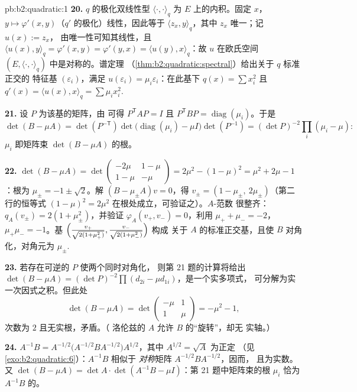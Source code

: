 \begin{solution}{pb:b2:quadratic:1}
\textbf{20.} $q$ 的极化双线性型
$\langle\cdot,\cdot\rangle_q$ 为 $E$ 上的内积。固定 $x$，$y \mapsto
\varphi'(x, y)$（$q'$ 的极化）线性，因此等于
$\langle z_x, y\rangle_q$，其中 $z_x$ 唯一；记 $u(x) := z_x$，
由唯一性可知其线性，且 $\langle u(x), y\rangle_q =
\varphi'(x,y) = \varphi'(y,x) = \langle u(y), x\rangle_q$：故 $u$
在欧氏空间 $(E,
\langle\cdot,\cdot\rangle_q)$ 中是对称的。谱定理
（\cref{thm:b2:quadratic:spectral}）给出关于 $q$ 标准正交的
特征基 $(\varepsilon_i)$，满足 $u(\varepsilon_i) =
\mu_i\varepsilon_i$：在此基下 $q(x) = \sum x_i^2$ 且 $q'(x) =
\langle u(x), x\rangle_q = \sum\mu_ix_i^2$.

\textbf{21.} 设 $P$ 为该基的矩阵，由
可得 $P^{\mathsf T}AP = I$ 且 $P^{\mathsf T}BP =
\operatorname{diag}(\mu_i)$。于是
\[
\det(B - \mu A) = \det(P^{-\mathsf T})
\det\bigl(\operatorname{diag}(\mu_i) - \mu I\bigr)
\det(P^{-1})
= (\det P)^{-2}\prod_i(\mu_i - \mu) :
\]
$\mu_i$ 即矩阵束 $\det(B - \mu A)$ 的根。

\textbf{22.} $\det(B - \mu A) =
\det\begin{pmatrix} -2\mu & 1-\mu\\ 1-\mu & -\mu\end{pmatrix}
= 2\mu^2 - (1-\mu)^2 = \mu^2 + 2\mu - 1$：根为 $\mu_\pm = -1
\pm \sqrt2$。解 $(B - \mu_\pm A)v = 0$，得 $v_\pm = (1 -
\mu_\pm,\ 2\mu_\pm)$（第二行的恒等式 $(1-\mu)^2 =
2\mu^2$ 在根处成立，可验证之）。$A$-范数
很整齐：$q_A(v_\pm) = 2(1 + \mu_\pm^2)$，并验证
$\varphi_A(v_+, v_-) = 0$，利用 $\mu_+ + \mu_- = -2$，
$\mu_+\mu_- = -1$。基 $\Bigl(\frac{v_+}{\sqrt{2(1 +
\mu_+^2)}}, \frac{v_-}{\sqrt{2(1+\mu_-^2)}}\Bigr)$ 构成
关于 $A$ 的标准正交基，且使 $B$ 对角化，对角元为
$\mu_\pm$.

\textbf{23.} 若存在可逆的 $P$ 使两个同时对角化，
则第 21 题的计算将给出 $\det(B - \mu A) = (\det
P)^{-2}\prod(d_{2i} - \mu d_{1i})$，是一个实多项式，
可分解为实一次因式之积。但此处
\[
\det(B - \mu A) = \det\begin{pmatrix} -\mu & 1\\ 1 &
\mu\end{pmatrix} = -\mu^2 - 1 ,
\]
次数为 $2$ 且无实根，矛盾。（
洛伦兹的 $A$ 允许 $B$ 的“旋转”，却无
实轴。）

\textbf{24.} $A^{-1}B = A^{-1/2}\bigl(A^{-1/2}BA^{-1/2}\bigr)
A^{1/2}$，其中 $A^{1/2} = \sqrt A$ 为正定
（见\cref{exo:b2:quadratic:6}）：$A^{-1}B$ 相似于
\emph{对称}矩阵 $A^{-1/2}BA^{-1/2}$，因而，
且为实数。又 $\det(B - \mu A) = \det A\cdot
\det(A^{-1}B - \mu I)$：第 21 题中矩阵束的根 $\mu_i$
恰为 $A^{-1}B$ 的。


\end{solution}
